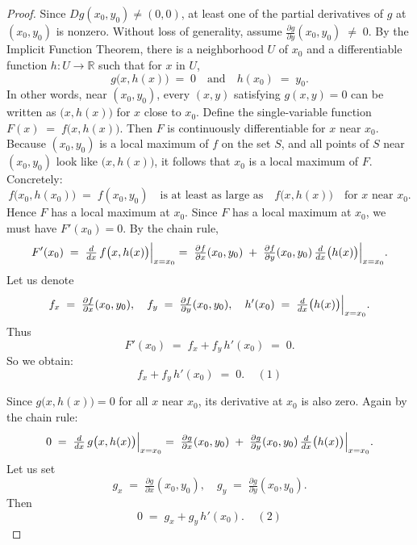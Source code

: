 \documentclass[11pt]{article}
\begin{document}
\begin{exercise}{1}
    \begin{proof} Since \(D g(x_0,y_0)\neq (0,0)\), at least one of the partial derivatives of \(g\) at \((x_0,y_0)\) is nonzero.  Without loss of generality, assume
\(
\tfrac{\partial g}{\partial y}(x_0,y_0)\;\neq\;0.
\)
By the Implicit Function Theorem, there is a neighborhood \(U\) of \(x_0\) and a differentiable function \(h:U \to \mathbb{R}\) such that for \(x\) in \(U\),
\[
g\bigl(x,h(x)\bigr)\;=\;0
\quad\text{and}\quad
h(x_0)\;=\;y_0.
\]
In other words, near \((x_0,y_0)\), every \((x,y)\) satisfying \(g(x,y)=0\) can be written as \(\bigl(x,h(x)\bigr)\) for \(x\) close to \(x_0\). Define the single-variable function
\(
F(x)\;=\;f\bigl(x,h(x)\bigr).
\)
Then \(F\) is continuously differentiable for \(x\) near \(x_0\).  Because \((x_0,y_0)\) is a local maximum of \(f\) on the set \(S\), and all points of \(S\) near \((x_0,y_0)\) look like \(\bigl(x,h(x)\bigr)\), it follows that \(x_0\) is a local maximum of \(F\).  Concretely:
\[
f\bigl(x_0,h(x_0)\bigr) \;=\; f(x_0,y_0)
\quad\text{is at least as large as}\quad
f\bigl(x,h(x)\bigr)
\quad\text{for }x\text{ near }x_0.
\]
Hence \(F\) has a local maximum at \(x_0\). Since \(F\) has a local maximum at \(x_0\), we must have \(F'(x_0)=0\).  By the chain rule,
\[
F'(x_0)
\;=\;
\tfrac{d}{dx}\,f\bigl(x,h(x)\bigr)\Bigl|_{x=x_0}
\;=\;
\tfrac{\partial f}{\partial x}(x_0,y_0)
\;+\;
\tfrac{\partial f}{\partial y}(x_0,y_0)\,\tfrac{d}{dx}\bigl(h(x)\bigr)\Bigl|_{x=x_0}.
\]
Let us denote
\[
f_x \;=\;\tfrac{\partial f}{\partial x}(x_0,y_0),
\quad
f_y \;=\;\tfrac{\partial f}{\partial y}(x_0,y_0),
\quad
h'(x_0) \;=\;\tfrac{d}{dx}\bigl(h(x)\bigr)\Bigl|_{x=x_0}.
\]
Thus
\[
F'(x_0) 
\;=\;
f_x + f_y\,h'(x_0)
\;=\;0.
\]
So we obtain:
\[
f_x + f_y\,h'(x_0) \;=\;0.
\;\;\;\;(1)
\]

Since \(g\bigl(x,h(x)\bigr)=0\) for all \(x\) near \(x_0\), its derivative at \(x_0\) is also zero.  Again by the chain rule:
\[
0
\;=\;
\tfrac{d}{dx}\,g\bigl(x,h(x)\bigr)\Bigl|_{x=x_0}
\;=\;
\tfrac{\partial g}{\partial x}(x_0,y_0)
\;+\;
\tfrac{\partial g}{\partial y}(x_0,y_0)\,\tfrac{d}{dx}\bigl(h(x)\bigr)\Bigl|_{x=x_0}.
\]
Let us set
\[
g_x \;=\;\tfrac{\partial g}{\partial x}(x_0,y_0),
\quad
g_y \;=\;\tfrac{\partial g}{\partial y}(x_0,y_0).
\]
Then
\[
0
\;=\;
g_x + g_y\,h'(x_0).
\;\;\;\;(2)
\]


\end{proof}
\end{exercise}
\end{document}
